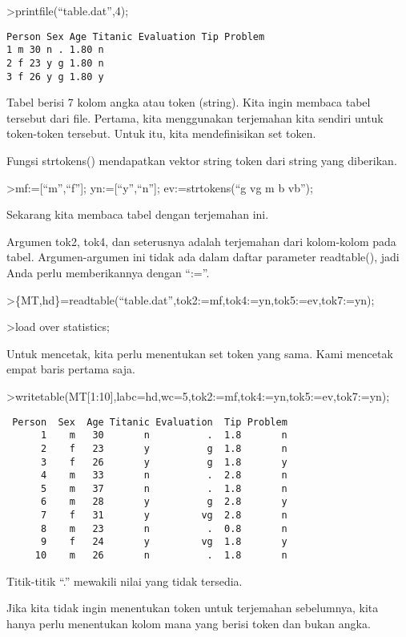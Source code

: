\documentclass[
]{book}
\begin{document}
\textgreater printfile(``table.dat'',4);

\begin{verbatim}
Person Sex Age Titanic Evaluation Tip Problem
1 m 30 n . 1.80 n
2 f 23 y g 1.80 n
3 f 26 y g 1.80 y
\end{verbatim}

Tabel berisi 7 kolom angka atau token (string). Kita ingin membaca tabel tersebut dari file. Pertama, kita menggunakan terjemahan kita sendiri untuk token-token tersebut. Untuk itu, kita mendefinisikan set token.

Fungsi strtokens() mendapatkan vektor string token dari string yang diberikan.

\textgreater mf:={[}``m'',``f''{]}; yn:={[}``y'',``n''{]}; ev:=strtokens(``g vg m b vb'');

Sekarang kita membaca tabel dengan terjemahan ini.

Argumen tok2, tok4, dan seterusnya adalah terjemahan dari kolom-kolom pada tabel. Argumen-argumen ini tidak ada dalam daftar parameter readtable(), jadi Anda perlu memberikannya dengan ``:=''.

\textgreater\{MT,hd\}=readtable(``table.dat'',tok2:=mf,tok4:=yn,tok5:=ev,tok7:=yn);

\textgreater load over statistics;

Untuk mencetak, kita perlu menentukan set token yang sama. Kami mencetak empat baris pertama saja.

\textgreater writetable(MT{[}1:10{]},labc=hd,wc=5,tok2:=mf,tok4:=yn,tok5:=ev,tok7:=yn);

\begin{verbatim}
 Person  Sex  Age Titanic Evaluation  Tip Problem
      1    m   30       n          .  1.8       n
      2    f   23       y          g  1.8       n
      3    f   26       y          g  1.8       y
      4    m   33       n          .  2.8       n
      5    m   37       n          .  1.8       n
      6    m   28       y          g  2.8       y
      7    f   31       y         vg  2.8       n
      8    m   23       n          .  0.8       n
      9    f   24       y         vg  1.8       y
     10    m   26       n          .  1.8       n
\end{verbatim}

Titik-titik ``.'' mewakili nilai yang tidak tersedia.

Jika kita tidak ingin menentukan token untuk terjemahan sebelumnya, kita hanya perlu menentukan kolom mana yang berisi token dan bukan angka.
\end{document}
